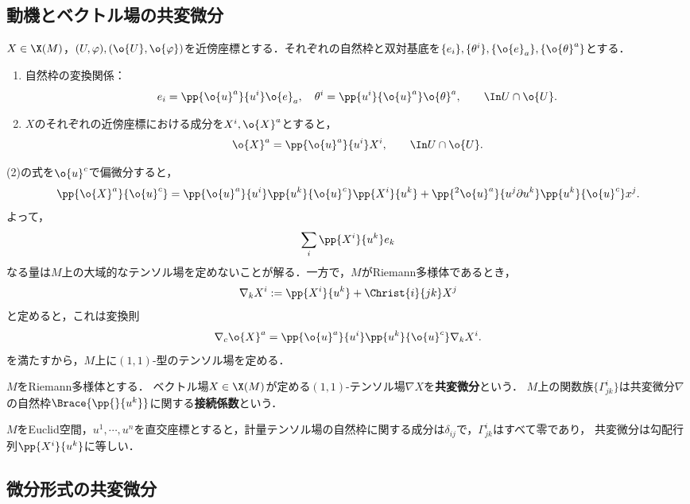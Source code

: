 \documentclass[uplatex,dvipdfmx]{jsreport}
\begin{document}
\subsection{動機とベクトル場の共変微分}

\begin{proposition}
    $X\in\X(M)$，$(U,\varphi),(\o{U},\o{\varphi})$を近傍座標とする．それぞれの自然枠と双対基底を$\{e_i\},\{\theta^i\},\{\o{e}_a\},\{\o{\theta}^a\}$とする．
    \begin{enumerate}
        \item 自然枠の変換関係：
        \[e_i=\pp{\o{u}^a}{u^i}\o{e}_a,\quad\theta^i=\pp{u^i}{\o{u}^a}\o{\theta}^a,\qquad\In U\cap\o{U}.\]
        \item $X$のそれぞれの近傍座標における成分を$X^i,\o{X}^a$とすると，
        \[\o{X}^a=\pp{\o{u}^a}{u^i}X^i,\qquad\In U\cap\o{U}.\]
    \end{enumerate}
\end{proposition}
\begin{remarks}
    (2)の式を$\o{u}^c$で偏微分すると，
    \[\pp{\o{X}^a}{\o{u}^c}=\pp{\o{u}^a}{u^i}\pp{u^k}{\o{u}^c}\pp{X^i}{u^k}+\pp{^2\o{u}^a}{u^j\partial u^k}\pp{u^k}{\o{u}^c}x^j.\]
    よって，
    \[\sum_{i}\pp{X^i}{u^k}e_k\]
    なる量は$M$上の大域的なテンソル場を定めないことが解る．一方で，$M$がRiemann多様体であるとき，
    \[\nabla_kX^i:=\pp{X^i}{u^k}+\Christ{i}{jk}X^j\]
    と定めると，これは変換則
    \[\nabla_c\o{X}^a=\pp{\o{u}^a}{u^i}\pp{u^k}{\o{u}^c}\nabla_kX^i.\]
    を満たすから，$M$上に$(1,1)$-型のテンソル場を定める．
\end{remarks}

\begin{definition}
    $M$をRiemann多様体とする．
    ベクトル場$X\in\X(M)$が定める$(1,1)$-テンソル場$\nabla X$を\textbf{共変微分}という．
    $M$上の関数族$\{\Gamma^i_{jk}\}$は共変微分$\nabla$の自然枠$\Brace{\pp{}{u^k}}$に関する\textbf{接続係数}という．
\end{definition}
\begin{remark}[勾配行列は共変微分の退化した例と見れる]
    $M$をEuclid空間，$u^1,\cdots,u^n$を直交座標とすると，計量テンソル場の自然枠に関する成分は$\delta_{ij}$で，$\Gamma^i_{jk}$はすべて零であり，
    共変微分は勾配行列$\pp{X^i}{u^k}$に等しい．
\end{remark}

\subsection{微分形式の共変微分}
\end{document}
